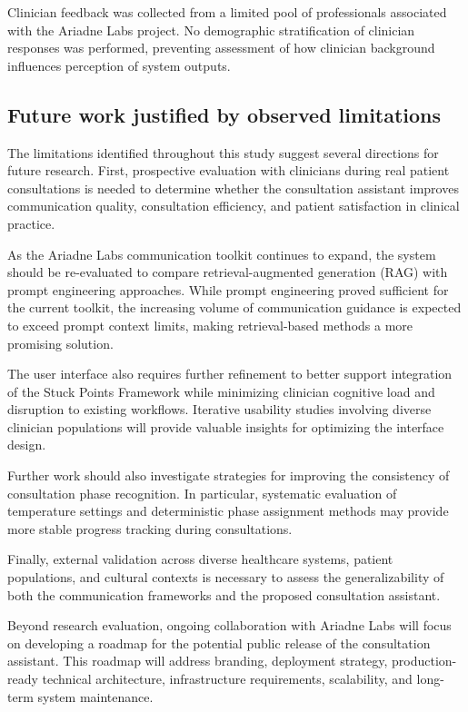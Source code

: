 Clinician feedback was collected from a limited pool of professionals associated with the Ariadne Labs project. No demographic stratification of clinician responses was performed, preventing assessment of how clinician background influences perception of system outputs.

\subsection{Future work justified by observed limitations}\label{sec:discussion_future}

The limitations identified throughout this study suggest several directions for future research. First, prospective evaluation with clinicians during real patient consultations is needed to determine whether the consultation assistant improves communication quality, consultation efficiency, and patient satisfaction in clinical practice.

As the Ariadne Labs communication toolkit continues to expand, the system should be re-evaluated to compare retrieval-augmented generation (RAG) with prompt engineering approaches. While prompt engineering proved sufficient for the current toolkit, the increasing volume of communication guidance is expected to exceed prompt context limits, making retrieval-based methods a more promising solution.

The user interface also requires further refinement to better support integration of the Stuck Points Framework while minimizing clinician cognitive load and disruption to existing workflows. Iterative usability studies involving diverse clinician populations will provide valuable insights for optimizing the interface design.

Further work should also investigate strategies for improving the consistency of consultation phase recognition. In particular, systematic evaluation of temperature settings and deterministic phase assignment methods may provide more stable progress tracking during consultations.

Finally, external validation across diverse healthcare systems, patient populations, and cultural contexts is necessary to assess the generalizability of both the communication frameworks and the proposed consultation assistant.

Beyond research evaluation, ongoing collaboration with Ariadne Labs will focus on developing a roadmap for the potential public release of the consultation assistant. This roadmap will address branding, deployment strategy, production-ready technical architecture, infrastructure requirements, scalability, and long-term system maintenance.

